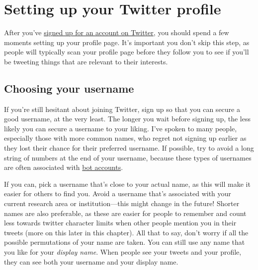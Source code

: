 \documentclass[
]{book}
\begin{document}
\hypertarget{setting-up-your-twitter-profile}{%
\section*{Setting up your Twitter profile}\label{setting-up-your-twitter-profile}}

After you've \href{https://twitter.com/}{signed up for an account on Twitter}, you should spend a few moments setting up your profile page. It's important you don't skip this step, as people will typically scan your profile page before they follow you to see if you'll be tweeting things that are relevant to their interests.

\hypertarget{choosing-your-username}{%
\subsection*{Choosing your username}\label{choosing-your-username}}

If you're still hesitant about joining Twitter, sign up so that you can secure a good username, at the very least. The longer you wait before signing up, the less likely you can secure a username to your liking. I've spoken to many people, especially those with more common names, who regret not signing up earlier as they lost their chance for their preferred username. If possible, try to avoid a long string of numbers at the end of your username, because these types of usernames are often associated with \href{https://en.wikipedia.org/wiki/Twitter_bot}{bot accounts}.

If you can, pick a username that's close to your actual name, as this will make it easier for others to find you. Avoid a username that's associated with your current research area or institution---this might change in the future! Shorter names are also preferable, as these are easier for people to remember and count less towards twitter character limits when other people mention you in their tweets (more on this later in this chapter). All that to say, don't worry if all the possible permutations of your name are taken. You can still use any name that you like for your \emph{display name}. When people see your tweets and your profile, they can see both your username and your display name.
\end{document}
